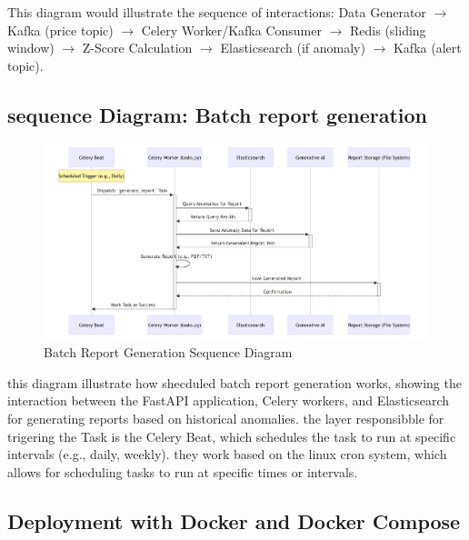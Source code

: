 This diagram would illustrate the sequence of interactions: Data Generator $\rightarrow$ Kafka (price topic) $\rightarrow$ Celery Worker/Kafka Consumer $\rightarrow$ Redis (sliding window) $\rightarrow$ Z-Score Calculation $\rightarrow$ Elasticsearch (if anomaly) $\rightarrow$ Kafka (alert topic).

\break





\subsection{sequence Diagram: Batch report generation}
\begin{figure}[H]
    
    \includegraphics[width=1.2\textwidth]{figures/batch-1.png}
    \caption{Batch Report Generation Sequence Diagram}
    \label{fig:batch_report_generation_sequence_diagram}


\end{figure}


this diagram illustrate how shecduled batch report generation works, showing the interaction between the FastAPI application, Celery workers, and Elasticsearch for generating reports based on historical anomalies.
the layer responsibble for trigering the Task is the Celery Beat, which schedules the task to run at specific intervals (e.g., daily, weekly).
they work based on the linux cron system, which allows for scheduling tasks to run at specific times or intervals.


\subsection{Deployment with Docker and Docker Compose}

